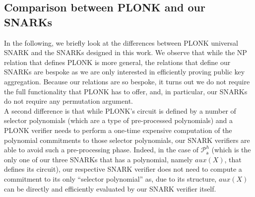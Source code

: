  \subsection{Comparison between PLONK and our SNARKs}
\label{sec:plonk_comparison}

\noindent In the following, we briefly look at the differences between PLONK universal SNARK and the SNARKs designed in this work. We observe 
that while the NP relation that defines PLONK is more general, the relations that define our SNARKs are bespoke as we are only interested in efficiently proving 
public key aggregation. Because our relations are so bespoke, it turns out we do not require the full functionality that PLONK has to offer, and, in particular, our SNARKs  
do not require any permutation argument. \\

\noindent A second difference is that while PLONK's circuit is defined by a number of selector 
polynomials (which are a type of pre-processed polynomials) and a PLONK verifier needs to perform 
a one-time expensive computation of the polynomial commitments to those selector polynomials, our SNARK verifiers 
are able to avoid such a pre-processing phase. Indeed, in the case of $\mathscr{P}^h_{\mathsf{a}}$ (which is the only one of 
our three SNARKs that has a polynomial, namely $\mathit{aux}(X)$, that defines its circuit), our respective SNARK verifier does not need to compute a 
commitment to its only ``selector polynomial'' as, due to its structure, $\mathit{aux}(X)$ can be directly and efficiently evaluated by our SNARK verifier itself. \\ 


